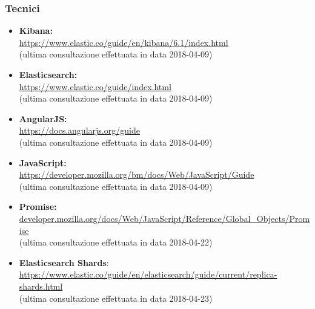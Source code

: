 \subsubsection{Tecnici}
\begin{itemize}
	\item \textbf{Kibana:}\\ \href{https://www.elastic.co/guide/en/kibana/6.1/index.html}{https://www.elastic.co/guide/en/kibana/6.1/index.html}\\(ultima consultazione effettuata in data 2018-04-09)
	\item \textbf{Elasticsearch:}\\ \href{https://www.elastic.co/guide/index.html}{https://www.elastic.co/guide/index.html}\\(ultima consultazione effettuata in data 2018-04-09)
	\item \textbf{AngularJS:}\\ \href{https://docs.angularjs.org/guide}{https://docs.angularjs.org/guide}\\(ultima consultazione effettuata in data 2018-04-09)
	\item \textbf{JavaScript:}\\ \href{https://developer.mozilla.org/bm/docs/Web/JavaScript/Guide}{https://developer.mozilla.org/bm/docs/Web/JavaScript/Guide}\\(ultima consultazione effettuata in data 2018-04-09) 
	\item \textbf{Promise:}\\ \href{https://developer.mozilla.org/docs/Web/JavaScript/Reference/Global\_Objects/Promise}{developer.mozilla.org/docs/Web/JavaScript/Reference/Global\_Objects/Promise}\\(ultima consultazione effettuata in data 2018-04-22) 
	\item \textbf{Elasticsearch Shards}:\\ \href{https://www.elastic.co/guide/en/elasticsearch/guide/current/replica-shards.html}{https://www.elastic.co/guide/en/elasticsearch/guide/current/replica-shards.html}\\(ultima consultazione effettuata in data 2018-04-23) 
\end{itemize}

